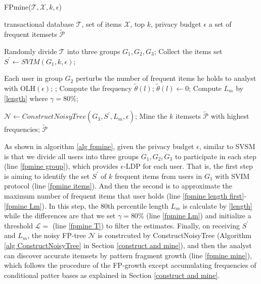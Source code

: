 \documentclass[conference]{IEEEtran}
\begin{document}
\begin{algorithm}[htbp]
  \caption{FPmine($\mathcal{T},\mathcal{X},k,\epsilon$)}
  \label{alg fpmine}
  \begin{algorithmic}[1]
  \REQUIRE transactional database $\mathcal{T}$, set of items $\mathcal{X}$, top $k$, privacy budget $\epsilon$
  \ENSURE a set of frequent itemsets $\tilde{\mathcal{P}}$

  \STATE Randomly divide $\mathcal{T}$ into three groups $G_1,G_2,G_3$; \label{fpmine group}
  \STATE Collect the items set $S^{\prime} \gets SVIM(G_1,k,\epsilon)$; \label{fpmine items}
  
  \STATE Each user in group $G_2$ perturbs the number of frequent items he holds to analyst with OLH$({\epsilon})$;\label{fpmine length first}
  ;\label{fpmine T}
    \STATE Compute the frequency $\tilde{\theta}(l)$;
      \STATE $\tilde{\theta}(l) \gets 0$;
    \ENDIF
  \ENDFOR
  \STATE Compute $L_{m}$ by \eqref{length} where $\gamma=80\%$;\label{fpmine Lm}

  \STATE $\mathcal{N} \gets ConstructNoisyTree(G_3,S^{\prime},L_m,\epsilon)$;
  \STATE Mine the $k$ itemsets $\tilde{\mathcal{P}}$ with highest frequencies; \label{fpmine mine}
  \RETURN $\tilde{\mathcal{P}}$
  \end{algorithmic}
\end{algorithm}

As shown in algorithm \ref{alg fpmine}, given the privacy budget $\epsilon$, similar to SVSM is that we divide all users into three groups $G_1,G_2,G_3$ to participate in each step (line \ref{fpmine group}), which provides $\epsilon$-LDP for each user. That is, the first step is aiming to identify the set $S^{\prime}$ of $k$ frequent items from users in $G_1$ with SVIM protocol (line \ref{fpmine items}). And then the second is to approximate the maximum number of frequent items that user holds (line \ref{fpmine length first}-\ref{fpmine Lm}). In this step, the 80th percentile length $L_m$ is calculate by \eqref{length} while the differences are that we set $\gamma=80\%$ (line \ref{fpmine Lm}) and initialize a threshold {\color{red}$\mathcal{L} = $} (line \ref{fpmine T}) to filter the estimates. Finally, on receiving $S^{\prime}$ and $L_m$, the noisy FP-tree {\color{red}$\mathcal{N}$} is constrcuted by ConstructNoisyTree (Algorithm \ref{alg ConstructNoisyTree} in Section \ref{construct and mine}), and then the analyst can discover accurate itemsets by pattern fragment growth (line \ref{fpmine mine}), which follows the procedure of the FP-growth except accumulating frequencies of conditional patter bases as explained in Section \ref{construct and mine}. 
\end{document}
